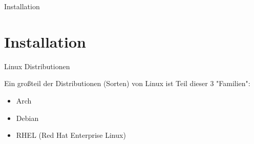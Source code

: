
\begin{frame}{Installation}
    \section{Installation}\label{sec:installation}



\end{frame}

\begin{frame}{Linux Distributionen}

    Ein großteil der Distributionen (Sorten) von Linux ist Teil dieser 3 "Familien":

    \begin{itemize}
        \item Arch
        \item Debian
        \item RHEL (Red Hat Enterprise Linux)
    \end{itemize}



\end{frame}